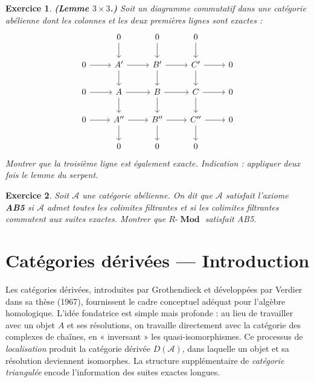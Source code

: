 \documentclass[a4paper,12pt]{book}
\DeclareMathOperator{\Mod}{\mathbf{Mod}}
\newtheorem{exercice}{Exercice}[chapter]
\begin{document}
\begin{exercice}\label{exo:nine-lemma}
\textbf{(Lemme $3 \times 3$.)}
Soit un diagramme commutatif dans une catégorie abélienne dont les
colonnes et les deux premières lignes sont exactes :
\[
\begin{tikzcd}
& 0 \arrow[d] & 0 \arrow[d] & 0 \arrow[d] \\
0 \arrow[r] & A' \arrow[r] \arrow[d] & B' \arrow[r] \arrow[d] & C' \arrow[r] \arrow[d] & 0 \\
0 \arrow[r] & A \arrow[r] \arrow[d] & B \arrow[r] \arrow[d] & C \arrow[r] \arrow[d] & 0 \\
0 \arrow[r] & A'' \arrow[r] \arrow[d] & B'' \arrow[r] \arrow[d] & C'' \arrow[r] \arrow[d] & 0 \\
& 0 & 0 & 0
\end{tikzcd}
\]
Montrer que la troisième ligne est également exacte.
\textit{Indication : appliquer deux fois le lemme du serpent.}
\end{exercice}

\begin{exercice}\label{exo:grothendieck-AB5}
Soit $\mathcal{A}$ une catégorie abélienne. On dit que $\mathcal{A}$
satisfait l'axiome \textbf{AB5} si $\mathcal{A}$ admet
toutes les colimites filtrantes et si les colimites filtrantes
commutent aux suites exactes. Montrer que $R\text{-}\Mod$ satisfait AB5.
\end{exercice}




\chapter{Catégories dérivées --- Introduction}\label{ch:derived}
\minitoc

\vspace{1em}

Les catégories dérivées, introduites par
Grothendieck et développées par
Verdier dans sa thèse (1967), fournissent le
cadre conceptuel adéquat pour l'algèbre homologique. L'idée fondatrice est
simple mais profonde : au lieu de travailler avec un objet $A$ et ses
résolutions, on travaille directement avec la catégorie des complexes de
chaînes, en « inversant » les quasi-isomorphismes. Ce processus de
\emph{localisation} produit la catégorie
dérivée $D(\mathcal{A})$, dans laquelle un objet et sa résolution deviennent
isomorphes. La structure supplémentaire de \emph{catégorie
triangulée} encode l'information des suites
exactes longues.
\end{document}
